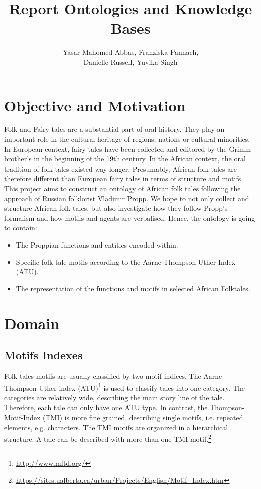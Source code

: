 \documentclass[10pt,a4paper]{article}
\author{Yasar Mahomed Abbas, Franziska Pannach, \\Danielle Russell, Yuvika Singh}
\title{Report Ontologies and Knowledge Bases}
\begin{document}
\maketitle


\section{Objective and Motivation}
Folk and Fairy tales are a substantial part of oral history. They play an important role in the cultural heritage of regions, nations or cultural minorities. In European context, fairy tales have been collected and editored by the Grimm brother's in the beginning of the 19th century.\cite{Grimm1857} In the African context, the oral tradition of folk tales existed way longer. Presumably, African folk tales are therefore different than European fairy tales in terms of structure and motifs. 
This project aims to construct an ontology of African folk tales following the approach of Russian folklorist Vladimir Propp. We hope to not only collect and structure African folk tales, but also investigate how they follow Propp's formalism and how motifs and agents are verbalised.
Hence, the ontology is going to contain: 

\begin{itemize}
	\item The Proppian functions and entities encoded within. 
	\item Specific folk tale motifs according to the Aarne-Thompson-Uther Index (ATU). 
	\item The representation of the functions and motifs in selected African Folktales. 
\end{itemize}


\section{Domain}
	\subsection{Motifs Indexes}
	Folk tales motifs are usually classified by two motif indices. The Aarne-Thompson-Uther index (ATU)\footnote{\url{http://www.mftd.org/}} is used to classify tales into one category. The categories are relatively wide, describing the main story line of the tale. Therefore, each tale can only have one ATU type. In contrast, the Thompson-Motif-Index (TMI) is more fine grained, describing single motifs, i.e. repeated elements, e.g. characters. The TMI motifs are organized in a hierarchical structure. A tale can be described with more than one TMI motif.\footnote{\url{https://sites.ualberta.ca/urban/Projects/English/Motif_Index.htm}}    
\end{document}
